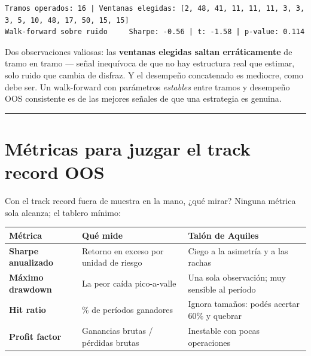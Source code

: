\documentclass[
  spanish,
  letterpaper,
  DIV=11,
  numbers=noendperiod]{scrreprt}
\begin{document}
\begin{verbatim}
Tramos operados: 16 | Ventanas elegidas: [2, 48, 41, 11, 11, 11, 3, 3, 3, 5, 10, 48, 17, 50, 15, 15]
Walk-forward sobre ruido     Sharpe: -0.56 | t: -1.58 | p-value: 0.114
\end{verbatim}

Dos observaciones valiosas: las \textbf{ventanas elegidas saltan
erráticamente} de tramo en tramo --- señal inequívoca de que no hay
estructura real que estimar, solo ruido que cambia de disfraz. Y el
desempeño concatenado es mediocre, como debe ser. Un walk-forward con
parámetros \emph{estables} entre tramos y desempeño OOS consistente es
de las mejores señales de que una estrategia es genuina.

\begin{center}\rule{0.5\linewidth}{0.5pt}\end{center}

\chapter{Métricas para juzgar el track record
OOS}\label{muxe9tricas-para-juzgar-el-track-record-oos}

Con el track record fuera de muestra en la mano, ¿qué mirar? Ninguna
métrica sola alcanza; el tablero mínimo:

\begin{longtable}[]{@{}
  >{\raggedright\arraybackslash}p{}
  >{\raggedright\arraybackslash}p{}
  >{\raggedright\arraybackslash}p{}@{}}
\toprule\noalign{}
\begin{minipage}[b]{\linewidth}\raggedright
Métrica
\end{minipage} & \begin{minipage}[b]{\linewidth}\raggedright
Qué mide
\end{minipage} & \begin{minipage}[b]{\linewidth}\raggedright
Talón de Aquiles
\end{minipage} \\
\midrule\noalign{}
\endhead
\bottomrule\noalign{}
\endlastfoot
\textbf{Sharpe anualizado} & Retorno en exceso por unidad de riesgo &
Ciego a la asimetría y a las rachas \\
\textbf{Máximo drawdown} & La peor caída pico-a-valle & Una sola
observación; muy sensible al período \\
\textbf{Hit ratio} & \% de períodos ganadores & Ignora tamaños: podés
acertar 60\% y quebrar \\
\textbf{Profit factor} & Ganancias brutas / pérdidas brutas & Inestable
con pocas operaciones \\
\end{longtable}
\end{document}
